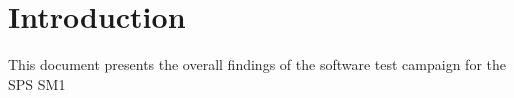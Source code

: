 \section{Introduction}

This document presents the overall findings of the software test campaign for the SPS SM1



